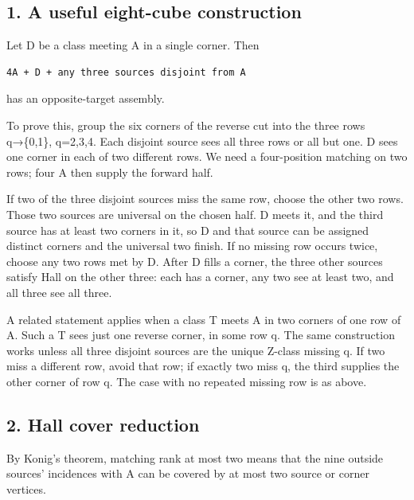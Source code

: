 \documentclass[
  10pt,
]{article}
\begin{document}
\hypertarget{a-useful-eight-cube-construction}{%
\subsection*{1. A useful eight-cube
construction}\label{a-useful-eight-cube-construction}}

Let D be a class meeting A in a single corner. Then

\begin{verbatim}
4A + D + any three sources disjoint from A
\end{verbatim}

has an opposite-target assembly.

To prove this, group the six corners of the reverse cut into the three
rows q→\{0,1\}, q=2,3,4. Each disjoint source sees all three rows or all
but one. D sees one corner in each of two different rows. We need a
four-position matching on two rows; four A then supply the forward half.

If two of the three disjoint sources miss the same row, choose the other
two rows. Those two sources are universal on the chosen half. D meets
it, and the third source has at least two corners in it, so D and that
source can be assigned distinct corners and the universal two finish. If
no missing row occurs twice, choose any two rows met by D. After D fills
a corner, the three other sources satisfy Hall on the other three: each
has a corner, any two see at least two, and all three see all three.

A related statement applies when a class T meets A in two corners of one
row of A. Such a T sees just one reverse corner, in some row q. The same
construction works unless all three disjoint sources are the unique
Z-class missing q. If two miss a different row, avoid that row; if
exactly two miss q, the third supplies the other corner of row q. The
case with no repeated missing row is as above.

\hypertarget{hall-cover-reduction}{%
\subsection*{2. Hall cover reduction}\label{hall-cover-reduction}}

By Konig's theorem, matching rank at most two means that the nine
outside sources' incidences with A can be covered by at most two source
or corner vertices.
\end{document}
